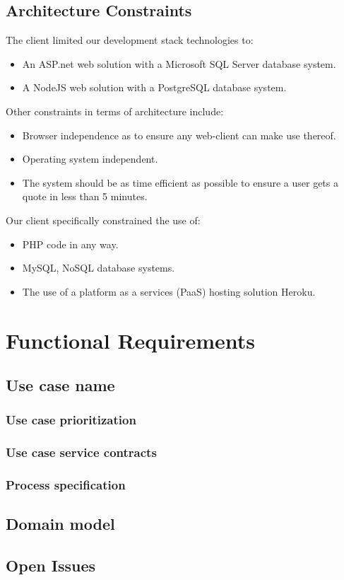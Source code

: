 \documentclass{article}
\begin{document}
	\subsection{Architecture Constraints}
	The client limited our development stack technologies to:
	\begin{itemize}
		\item An ASP.net web solution with a Microsoft SQL Server database system.
		\item A NodeJS web solution with a PostgreSQL database system.
	\end{itemize}
	Other constraints in terms of architecture include:
	\begin{itemize}
		\item Browser independence as to ensure any web-client can make use thereof.
		\item Operating system independent.
		\item The system should be as time efficient as possible to ensure a user gets a quote in less than 5 minutes.
		\end{itemize}
	Our client specifically constrained the use of:
		\begin{itemize}
		\item PHP code in any way.
		\item MySQL, NoSQL database systems.
		\item The use of a platform as a services (PaaS) hosting solution Heroku.
		\end{itemize}
	

\section{Functional Requirements}

	\subsection{Use case name}
		\subsubsection{Use case prioritization}
		\subsubsection{Use case service contracts}
		\subsubsection{Process specification}
	
	\subsection{Domain model}
	\subsection{Open Issues}


	
\end{document}
